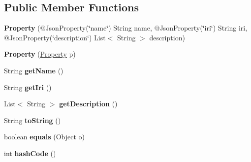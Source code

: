 \subsection*{Public Member Functions}
\begin{DoxyCompactItemize}
\item 
\mbox{\label{classeu_1_1h2020_1_1symbiote_1_1model_1_1cim_1_1Property_aab9e6ce65f47666b34c1e797c520cd8b}} 
{\bfseries Property} (@Json\+Property(\char`\"{}name\char`\"{}) String name, @Json\+Property(\char`\"{}iri\char`\"{}) String iri, @Json\+Property(\char`\"{}description\char`\"{}) List$<$ String $>$ description)
\item 
\mbox{\label{classeu_1_1h2020_1_1symbiote_1_1model_1_1cim_1_1Property_a53ee336cdcd515e09b2d56b7088e4c78}} 
{\bfseries Property} (\hyperlink{classeu_1_1h2020_1_1symbiote_1_1model_1_1cim_1_1Property}{Property} p)
\item 
\mbox{\label{classeu_1_1h2020_1_1symbiote_1_1model_1_1cim_1_1Property_ac4e3643bcac82dd327cda303c1ca3688}} 
String {\bfseries get\+Name} ()
\item 
\mbox{\label{classeu_1_1h2020_1_1symbiote_1_1model_1_1cim_1_1Property_a040598d83a48b03589e06c818db736c3}} 
String {\bfseries get\+Iri} ()
\item 
\mbox{\label{classeu_1_1h2020_1_1symbiote_1_1model_1_1cim_1_1Property_ad4e096367df96fd6c9ea134a70939278}} 
List$<$ String $>$ {\bfseries get\+Description} ()
\item 
\mbox{\label{classeu_1_1h2020_1_1symbiote_1_1model_1_1cim_1_1Property_ae9f3dc227c94969094019025856b70cf}} 
String {\bfseries to\+String} ()
\item 
\mbox{\label{classeu_1_1h2020_1_1symbiote_1_1model_1_1cim_1_1Property_a5ef6983e1a3b84ce51e9c8cb77917aef}} 
boolean {\bfseries equals} (Object o)
\item 
\mbox{\label{classeu_1_1h2020_1_1symbiote_1_1model_1_1cim_1_1Property_a2cb0beb6b297a441e7885593f1366f06}} 
int {\bfseries hash\+Code} ()
\end{DoxyCompactItemize}


